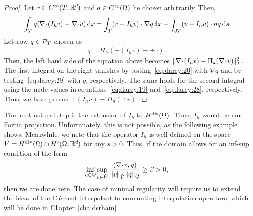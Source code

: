 \begin{proof}
  Let $v\in C^\infty(T;\mathbb R^d)$ and $q\in C^\infty(\Omega)$ be
  chosen arbitrarily. Then,
  \begin{gather*}
    \int_T q(\nabla\!\cdot\! (I_h v) - \nabla\!\cdot\! v)\,\mathrm{d} x
    = \int_T(v-I_h v) \cdot \nabla q\,\mathrm{d} x
    - \int_{\partial T} (v-I_h v)\cdot n q \,\mathrm{d} s
  \end{gather*}
  Let now $q\in \mathcal P_T$ chosen as
  \begin{gather*}
    q = \Pi_h (\div (I_h v) - \div v).
  \end{gather*}
  Then, the left hand side of the equation above becomes
  $\lVert\nabla\!\cdot\!(I_h v) - \Pi_h(\nabla\!\cdot\! v)\rVert_T^2$. The first integral on
  the right vanishes by testing~\eqref{eq:darcy:20} with
  $\nabla q$ and by testing~\eqref{eq:darcy:29} with $q$,
  respectively.
  The same holds for the second integral using the node values in
  equations~\eqref{eq:darcy:19} and~\eqref{eq:darcy:28},
  respectively. Thus, we have proven $\div (I_h v) = \Pi_h(\div v)$.
\end{proof}

\begin{remark}
  The next natural step is the extension of $I_h$ to
  $H^{\text{div}}(\Omega)$. Then, $I_h$ would be our Fortin
  projection. Unfortunately, this is not possible, as the following
  example shows. Meanwhile, we note that the operator $I_h$ is
  well-defined on the space $\tilde V=H^{\text{div}}(\Omega) \cap H^s(\Omega;\mathbb R^d)$
  for any $s>0$. Thus, if the domain allows for an inf-sup condition
  of the form
  \begin{gather*}
    \inf_{q\in Q}\sup_{v\in \tilde V} \frac{(\nabla\!\cdot\!
      v,q)}{\lVert v\rVert_{\tilde V}\lVert q\rVert_Q} \ge \beta > 0,
  \end{gather*}
  then we are done here. The case of minimal regularity will require
  us to extend the ideas of the Clément interpolant to commuting
  interpolation operators, which will be done in
  Chapter~\ref{cha:derham}.
\end{remark}

